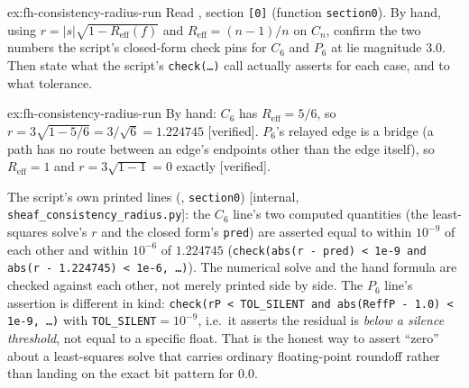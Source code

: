 \documentclass[11pt,a4paper]{article}
\theoremstyle{definition}
\theoremstyle{remark}
\begin{document}
\begin{pdexercise}[kind=Trace,rating=2]{ex:fh-consistency-radius-run}
Read , section \texttt{[0]} (function \texttt{section0}). By hand, using $r=|s|\sqrt{1-R_{\mathrm{eff}}(f)}$ and $R_{\mathrm{eff}}=(n-1)/n$ on $C_n$, confirm the two numbers the script's closed-form check pins for $C_6$ and $P_6$ at lie magnitude $3.0$. Then state what the script's \texttt{check(\ldots)} call actually asserts for each case, and to what tolerance.
\end{pdexercise}
\begin{pdsolution}{ex:fh-consistency-radius-run}
By hand: $C_6$ has $R_{\mathrm{eff}}=5/6$, so $r=3\sqrt{1-5/6}=3/\sqrt6=1.224745$ [verified]. $P_6$'s relayed edge is a bridge (a path has no route between an edge's endpoints other than the edge itself), so $R_{\mathrm{eff}}=1$ and $r=3\sqrt{1-1}=0$ exactly [verified].

The script's own printed lines (, \texttt{section0}) [internal, \texttt{sheaf\_consistency\_radius.py}]: the $C_6$ line's two computed quantities (the least-squares solve's $r$ and the closed form's \texttt{pred}) are asserted equal to within $10^{-9}$ of each other and within $10^{-6}$ of $1.224745$ (\texttt{check(abs(r - pred) < 1e-9 and abs(r - 1.224745) < 1e-6, \ldots)}). The numerical solve and the hand formula are checked against each other, not merely printed side by side. The $P_6$ line's assertion is different in kind: \texttt{check(rP < TOL\_SILENT and abs(ReffP - 1.0) < 1e-9, \ldots)} with \texttt{TOL\_SILENT}$=10^{-9}$, i.e.\ it asserts the residual is \emph{below a silence threshold}, not equal to a specific float. That is the honest way to assert ``zero'' about a least-squares solve that carries ordinary floating-point roundoff rather than landing on the exact bit pattern for $0.0$.
\end{pdsolution}
\end{document}
